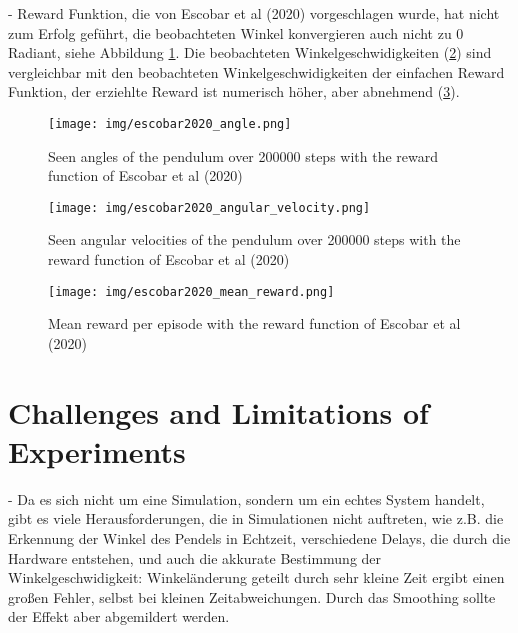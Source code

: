 - Reward Funktion, die von Escobar et al (2020) vorgeschlagen wurde, hat nicht zum Erfolg geführt, die beobachteten Winkel konvergieren auch nicht zu 0 Radiant, siehe Abbildung \ref{fig:angle_escobar2020}. Die beobachteten Winkelgeschwidigkeiten (\ref{fig:angle_velocity_escobar2020}) sind vergleichbar mit den beobachteten Winkelgeschwidigkeiten der einfachen Reward Funktion, der erziehlte Reward ist numerisch höher, aber abnehmend (\ref{fig:mean_reward_escobar2020}).
\begin{figure}[htbp]
    \centering
    \texttt{[image: img/escobar2020\_angle.png]}
    \caption{Seen angles of the pendulum over 200000 steps with the reward function of Escobar et al (2020)}
    \label{fig:angle_escobar2020}
\end{figure}
\begin{figure}[htbp]
    \centering
    \texttt{[image: img/escobar2020\_angular\_velocity.png]}
    \caption{Seen angular velocities of the pendulum over 200000 steps with the reward function of Escobar et al (2020)}
    \label{fig:angle_velocity_escobar2020}
\end{figure}
\begin{figure}[htbp]
    \centering
    \texttt{[image: img/escobar2020\_mean\_reward.png]}
    \caption{Mean reward per episode with the reward function of Escobar et al (2020)}
    \label{fig:mean_reward_escobar2020}
\end{figure}

\section{Challenges and Limitations of Experiments}
- Da es sich nicht um eine Simulation, sondern um ein echtes System handelt, gibt es viele Herausforderungen, die in Simulationen nicht auftreten, wie z.B. die Erkennung der Winkel des Pendels in Echtzeit, verschiedene Delays, die durch die Hardware entstehen, und auch die akkurate Bestimmung der Winkelgeschwidigkeit: Winkeländerung geteilt durch sehr kleine Zeit ergibt einen großen Fehler, selbst bei kleinen Zeitabweichungen. Durch das Smoothing sollte der Effekt aber abgemildert werden.


